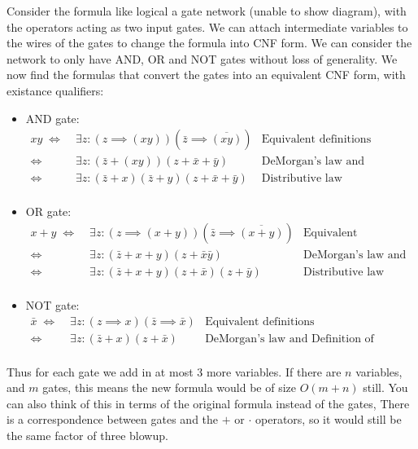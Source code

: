 \documentclass[english]{article}
\begin{document}
Consider the formula like logical a gate network (unable to show diagram), with the operators acting as two input
gates. We can attach intermediate variables to the wires of the gates to change the formula into CNF form. We
can consider the network to only have AND, OR and NOT gates without loss of generality. We now find the formulas
that convert the gates into an equivalent CNF form, with existance qualifiers:
\begin{itemize}
\item AND gate:
\begin{align*}
xy \;\iff&\; \exists z : (z \implies (xy))(\bar{z} \implies \overline{(xy)}) & \textrm{Equivalent definitions} \\
\iff &\; \exists z : (\bar{z} + (xy))(z + \bar{x} + \bar{y}) & \textrm{DeMorgan's law and Definition of Implication}\\
\iff &\; \exists z : (\bar{z} + x)(\bar{z} + y)(z + \bar{x} + \bar{y}) & \textrm{Distributive law} \\
\end{align*}
\item OR gate:
\begin{align*}
x + y \;\iff&\;\exists z:(z \implies(x + y))(\bar{z}\implies \overline{(x + y)})&\textrm{Equivalent definitions} \\
\iff &\; \exists z : (\bar{z} + x + y)(z + \bar{x}\bar{y}) & \textrm{DeMorgan's law and Definition of Implication} \\
\iff &\; \exists z : (\bar{z} + x + y)(z + \bar{x})(z + \bar{y}) & \textrm{Distributive law} \\
\end{align*}
\item NOT gate:
\begin{align*}
\bar{x} \;\iff&\;\exists z:(z \implies x)(\bar{z}\implies \bar{x}) & \textrm{Equivalent definitions} \\
\iff &\; \exists z : (\bar{z} + x)(z + \bar{x}) & \textrm{DeMorgan's law and Definition of Implication} \\
\end{align*}
\end{itemize}
Thus for each gate we add in at most 3 more variables. If there are $n$ variables, and $m$ gates, this means the new
formula would be of size $O(m + n)$ still. You can also think of this in terms of the original formula instead of the
gates, There is a correspondence between gates and the $+$ or $\cdot$ operators, so it would still be the same factor
of three blowup.
\end{document}
